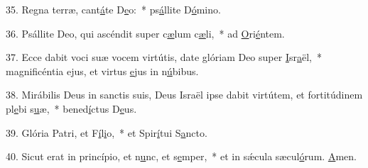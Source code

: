 35. Regna terræ, cant\uline{á}te D\uline{e}o:~* ps\uline{á}llite D\uline{ó}mino.\par 
36. Psállite Deo, qui ascéndit super c\uline{æ}lum c\uline{æ}li,~* ad \uline{O}ri\uline{é}ntem.\par 
37. Ecce dabit voci suæ vocem virtútis, date glóriam Deo super \uline{I}sr\uline{a}ël,~* magnificéntia ejus, et virtus \uline{e}jus in n\uline{ú}bibus.\par 
38. Mirábilis Deus in sanctis suis, Deus Israël ipse dabit virtútem, et fortitúdinem pl\uline{e}bi s\uline{u}æ,~* bened\uline{í}ctus D\uline{e}us.\par 
39. Glória Patri, et F\uline{í}l\uline{i}o,~* et Spir\uline{í}tui S\uline{a}ncto.\par 
40. Sicut erat in princípio, et n\uline{u}nc, et s\uline{e}mper,~* et in sǽcula sæcul\uline{ó}rum. \uline{A}men.\par 
